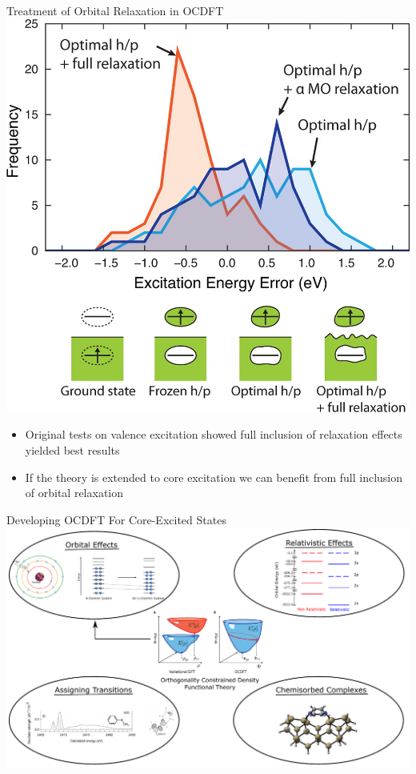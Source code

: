 \documentclass[t]{beamer}
\begin{document}
\begin{frame}{Treatment of Orbital Relaxation in OCDFT}
\centering
\includegraphics[scale=0.65]{relaxation_original.jpeg}
\begin{itemize}
\item Original tests on valence excitation showed full inclusion of relaxation effects yielded best results\footnotemark
\item If the theory is extended to core excitation we can benefit from full inclusion of orbital relaxation
\end{itemize}
\end{frame}

\begin{frame}{Developing OCDFT For Core-Excited States}
\centering
\includegraphics[width=\linewidth]{project_intro_1.pdf}
\end{frame}
\end{document}

